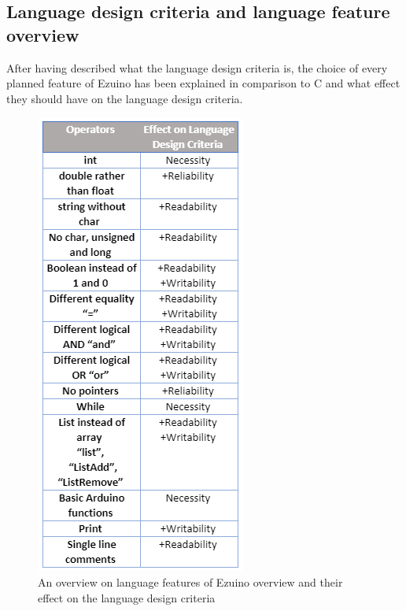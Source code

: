 \subsection*{Language design criteria and language feature overview}
After having described what the language design criteria is, the choice of every planned feature of Ezuino has been explained in comparison to C and what effect they should have on the language design criteria.
\begin{figure}[H]
\centering
\includegraphics[scale=0.80]{figures/language_features/Operators-and-effect-on-language-criteria.png}
\caption{An overview on language features of Ezuino overview and their effect on the language design criteria}
\label{feature-overview}
\end{figure}